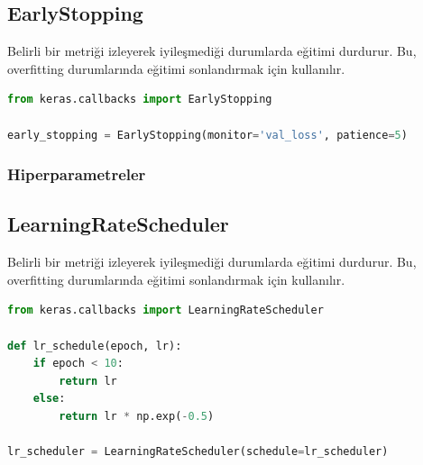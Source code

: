 \subsection{EarlyStopping}
Belirli bir metriği izleyerek iyileşmediği durumlarda eğitimi durdurur. Bu, overfitting durumlarında eğitimi sonlandırmak için kullanılır.

\begin{lstlisting}[language=Python]
from keras.callbacks import EarlyStopping

early_stopping = EarlyStopping(monitor='val_loss', patience=5)
\end{lstlisting}

\subsubsection{Hiperparametreler}
\begin{table}[h]
\centering
{\scriptsize\renewcommand{\arraystretch}{0.4}
{}}
\end{table}

\subsection{LearningRateScheduler}
Belirli bir metriği izleyerek iyileşmediği durumlarda eğitimi durdurur. Bu, overfitting durumlarında eğitimi sonlandırmak için kullanılır.

\begin{lstlisting}[language=Python]
from keras.callbacks import LearningRateScheduler

def lr_schedule(epoch, lr): 
	if epoch < 10:
		return lr
	else:
		return lr * np.exp(-0.5)

lr_scheduler = LearningRateScheduler(schedule=lr_scheduler)
\end{lstlisting}


